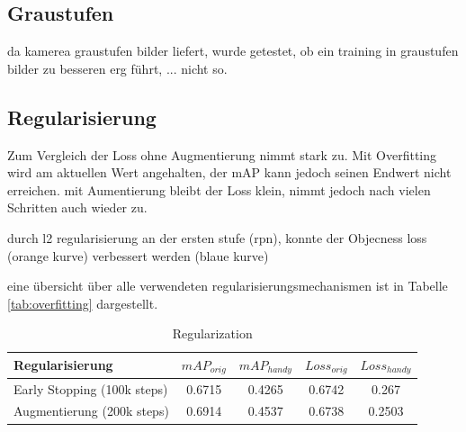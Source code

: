\subsection{Graustufen}
da kamerea graustufen bilder liefert, wurde getestet, ob ein 
training in graustufen bilder zu besseren erg führt, ... nicht so.



\subsection{Regularisierung}\label{subsec:regularisierung}


Zum Vergleich der Loss ohne Augmentierung nimmt stark zu. Mit Overfitting 
wird am aktuellen Wert angehalten, der mAP kann jedoch seinen Endwert nicht 
erreichen. mit Aumentierung bleibt der Loss klein, nimmt jedoch nach
vielen Schritten auch wieder zu.





durch l2 regularisierung an der ersten stufe (rpn), konnte 
der Objecness loss (orange kurve) verbessert werden (blaue kurve)



\begin{minipage}[t]{0.5\textwidth}
    \centering
    \label{fig:speed_acc}
    \def\svgwidth{0.9\textwidth}
    
\end{minipage}
\begin{minipage}[t]{0.5\textwidth}
    \centering
    \label{fig:speed_acc}
    \def\svgwidth{0.9\textwidth}
    
\end{minipage}


eine übersicht über alle verwendeten regularisierungsmechanismen ist in 
Tabelle \ref{tab:overfitting} dargestellt.





\begin{table}[htb]
    \centering
    \label{tab:regularization}
    \begin{tabular}{| l || c | c | c | c |} 
        \hline
        Regularisierung & $mAP_{orig}$ & $mAP_{handy}$ & $Loss_{orig}$ &  $Loss_{handy}$\\
        \hline
        Early Stopping (100k steps) & 0.6715 & 0.4265 & 0.6742 & 0.267\\
        \hline
        Augmentierung (200k steps) & 0.6914 & 0.4537 & 0.6738 & 0.2503\\ %
        \hline
    \end{tabular}        
    \caption{Regularization}
\end{table}





